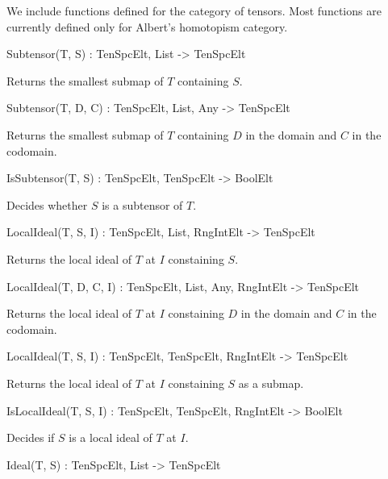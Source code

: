 We include functions defined for the category of tensors.
Most functions are currently defined only for Albert's homotopism category.

\begin{intrinsics}
Subtensor(T, S) : TenSpcElt, List -> TenSpcElt
\end{intrinsics}

Returns the smallest submap of $T$ containing $S$.

\begin{intrinsics}
Subtensor(T, D, C) : TenSpcElt, List, Any -> TenSpcElt
\end{intrinsics}

Returns the smallest submap of $T$ containing $D$ in the domain and $C$ in the 
codomain.

\begin{intrinsics}
IsSubtensor(T, S) : TenSpcElt, TenSpcElt -> BoolElt
\end{intrinsics}

Decides whether $S$ is a subtensor of $T$.

\begin{intrinsics}
LocalIdeal(T, S, I) : TenSpcElt, List, {RngIntElt} -> TenSpcElt
\end{intrinsics}

Returns the local ideal of $T$ at $I$ constaining $S$.

\begin{intrinsics}
LocalIdeal(T, D, C, I) : TenSpcElt, List, Any, {RngIntElt} -> TenSpcElt
\end{intrinsics}

Returns the local ideal of $T$ at $I$ constaining $D$ in the domain and $C$ 
in the codomain.

\begin{intrinsics}
LocalIdeal(T, S, I) : TenSpcElt, TenSpcElt, {RngIntElt} -> TenSpcElt
\end{intrinsics}

Returns the local ideal of $T$ at $I$ constaining $S$ as a submap.


\begin{intrinsics}
IsLocalIdeal(T, S, I) : TenSpcElt, TenSpcElt, {RngIntElt} -> BoolElt
\end{intrinsics}

Decides if $S$ is a local ideal of $T$ at $I$.

\begin{intrinsics}
Ideal(T, S) : TenSpcElt, List -> TenSpcElt
\end{intrinsics}

